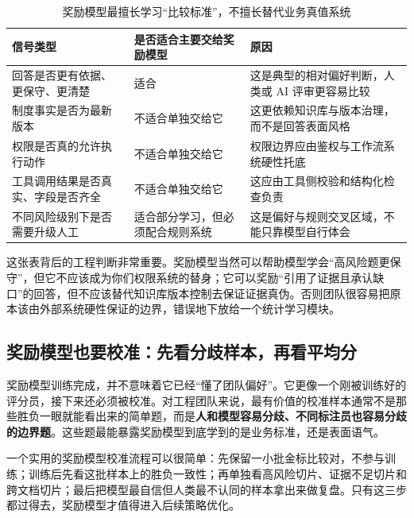 \begin{table}[H]
\centering
\small
\begin{tabularx}{\textwidth}{>{\raggedright\arraybackslash}p{3cm}>{\raggedright\arraybackslash}p{3cm}>{\raggedright\arraybackslash}X}
\toprule
\textbf{信号类型} & \textbf{是否适合主要交给奖励模型} & \textbf{原因} \\
\midrule
回答是否更有依据、更保守、更清楚 & 适合 & 这是典型的相对偏好判断，人类或 AI 评审更容易比较 \\
制度事实是否为最新版本 & 不适合单独交给它 & 这更依赖知识库与版本治理，而不是回答表面风格 \\
权限是否真的允许执行动作 & 不适合单独交给它 & 权限边界应由鉴权与工作流系统硬性托底 \\
工具调用结果是否真实、字段是否齐全 & 不适合单独交给它 & 这应由工具侧校验和结构化检查负责 \\
不同风险级别下是否需要升级人工 & 适合部分学习，但必须配合规则系统 & 这是偏好与规则交叉区域，不能只靠模型自行体会 \\
\bottomrule
\end{tabularx}
\caption{奖励模型最擅长学习“比较标准”，不擅长替代业务真值系统}
\label{tab:reward-model-boundary}
\end{table}

这张表背后的工程判断非常重要。奖励模型当然可以帮助模型学会“高风险题更保守”，但它不应该成为你们权限系统的替身；它可以奖励“引用了证据且承认缺口”的回答，但不应该替代知识库版本控制去保证证据真伪。否则团队很容易把原本该由外部系统硬性保证的边界，错误地下放给一个统计学习模块。

\subsection{奖励模型也要校准：先看分歧样本，再看平均分}
奖励模型训练完成，并不意味着它已经“懂了团队偏好”。它更像一个刚被训练好的评分员，接下来还必须被校准。对工程团队来说，最有价值的校准样本通常不是那些胜负一眼就能看出来的简单题，而是\textbf{人和模型容易分歧、不同标注员也容易分歧的边界题}。这些题最能暴露奖励模型到底学到的是业务标准，还是表面语气。

一个实用的奖励模型校准流程可以很简单：先保留一小批金标比较对，不参与训练；训练后先看这批样本上的胜负一致性；再单独看高风险切片、证据不足切片和跨文档切片；最后把模型最自信但人类最不认同的样本拿出来做复盘。只有这三步都过得去，奖励模型才值得进入后续策略优化。

